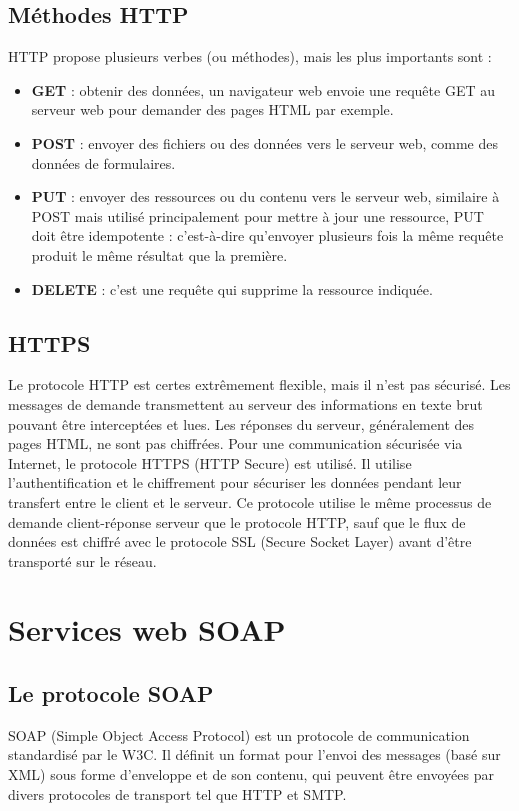 \subsection{Méthodes HTTP}
HTTP propose plusieurs verbes (ou méthodes), mais les plus importants sont : 
\begin{itemize}
	\item \textbf{GET} : obtenir des données, un navigateur web envoie une requête GET au serveur web pour demander des pages HTML par exemple.
	\item \textbf{POST} : envoyer des fichiers ou des données vers le serveur web, comme des données de formulaires.
	\item \textbf{PUT} : envoyer des ressources ou du contenu vers le serveur web, similaire à POST mais utilisé principalement pour mettre à jour une ressource, PUT doit être idempotente : c'est-à-dire qu'envoyer plusieurs fois la même requête produit le même résultat que la première.
	\item \textbf{DELETE} : c'est une requête  qui supprime la ressource indiquée.
\end{itemize}

\subsection{HTTPS}
Le protocole HTTP est certes extrêmement flexible, mais il n'est pas sécurisé. Les messages de demande transmettent au serveur des informations en texte brut pouvant être interceptées et lues. Les réponses du serveur, généralement des pages HTML, ne sont pas chiffrées.
Pour une communication sécurisée via Internet, le protocole HTTPS (HTTP Secure) est utilisé. \newline Il utilise l'authentification et le chiffrement pour sécuriser les données pendant leur transfert entre le client et le serveur. Ce protocole utilise le même processus de demande client-réponse serveur que le protocole HTTP, sauf que le flux de données est chiffré avec le protocole SSL (Secure Socket Layer) avant d'être transporté sur le réseau.

\newpage
\section{Services web SOAP} 
\subsection{Le protocole SOAP}
SOAP (Simple Object Access Protocol) est un protocole de communication standardisé par le W3C. 
Il définit un format pour l'envoi des messages (basé sur XML) sous forme d'enveloppe et de son contenu, qui peuvent être envoyées par divers protocoles de transport tel que HTTP et SMTP.
				
